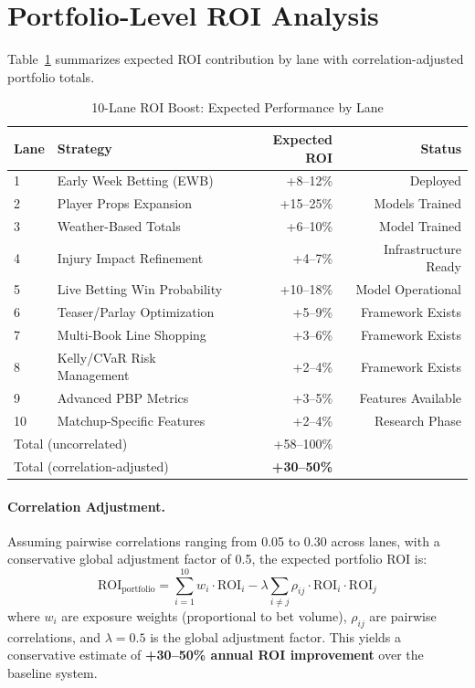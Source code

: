 \section{Portfolio-Level ROI Analysis}

Table~\ref{tab:lanes-summary} summarizes expected ROI contribution by lane with correlation-adjusted portfolio totals.

\begin{table}[htbp]
\centering
\caption{10-Lane ROI Boost: Expected Performance by Lane}
\label{tab:lanes-summary}
\begin{tabular}{@{} l l r r @{}}
\toprule
 \textbf{Lane} & \textbf{Strategy} & \textbf{Expected ROI} & \textbf{Status} \\
\midrule
1 & Early Week Betting (EWB) & +8--12\% & Deployed \\
2 & Player Props Expansion & +15--25\% & Models Trained \\
3 & Weather-Based Totals & +6--10\% & Model Trained \\
4 & Injury Impact Refinement & +4--7\% & Infrastructure Ready \\
5 & Live Betting Win Probability & +10--18\% & Model Operational \\
6 & Teaser/Parlay Optimization & +5--9\% & Framework Exists \\
7 & Multi-Book Line Shopping & +3--6\% & Framework Exists \\
8 & Kelly/CVaR Risk Management & +2--4\% & Framework Exists \\
9 & Advanced PBP Metrics & +3--5\% & Features Available \\
10 & Matchup-Specific Features & +2--4\% & Research Phase \\
\midrule
\multicolumn{2}{l}{Total (uncorrelated)} & +58--100\% & \\
\multicolumn{2}{l}{Total (correlation-adjusted)} & \textbf{+30--50\%} & \\
\bottomrule
\end{tabular}
\end{table}

\paragraph{Correlation Adjustment.}
Assuming pairwise correlations ranging from 0.05 to 0.30 across lanes, with a conservative global adjustment factor of 0.5, the expected portfolio ROI is:
\[
\text{ROI}_{\text{portfolio}} = \sum_{i=1}^{10} w_i \cdot \text{ROI}_i - \lambda \sum_{i \neq j} \rho_{ij} \cdot \text{ROI}_i \cdot \text{ROI}_j
\]
where $w_i$ are exposure weights (proportional to bet volume), $\rho_{ij}$ are pairwise correlations, and $\lambda = 0.5$ is the global adjustment factor. This yields a conservative estimate of \textbf{+30--50\% annual ROI improvement} over the baseline system.

